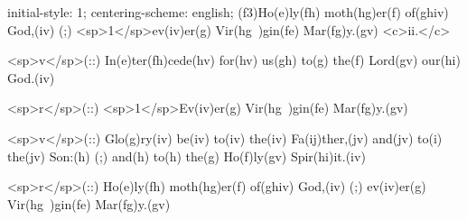 initial-style: 1;
centering-scheme: english;
(f3)Ho(e)ly(fh) moth(hg)er(f) of(ghiv) God,(iv) (;) <sp>1</sp>ev(iv)er(g) Vir(hg~)gin(fe) Mar(fg)y.(gv) <c>ii.</c>

<sp>v</sp>(::) In(e)ter(fh)cede(hv) for(hv) us(gh) to(g) the(f) Lord(gv) our(hi) God.(iv)

<sp>r</sp>(::) <sp>1</sp>Ev(iv)er(g) Vir(hg~)gin(fe) Mar(fg)y.(gv)

<sp>v</sp>(::) Glo(g)ry(iv) be(iv) to(iv) the(iv) Fa(ij)ther,(jv) and(jv) to(i) the(jv) Son:(h) (;) and(h) to(h) the(g) Ho(f)ly(gv) Spir(hi)it.(iv)

<sp>r</sp>(::) Ho(e)ly(fh) moth(hg)er(f) of(ghiv) God,(iv) (;) ev(iv)er(g) Vir(hg~)gin(fe) Mar(fg)y.(gv)